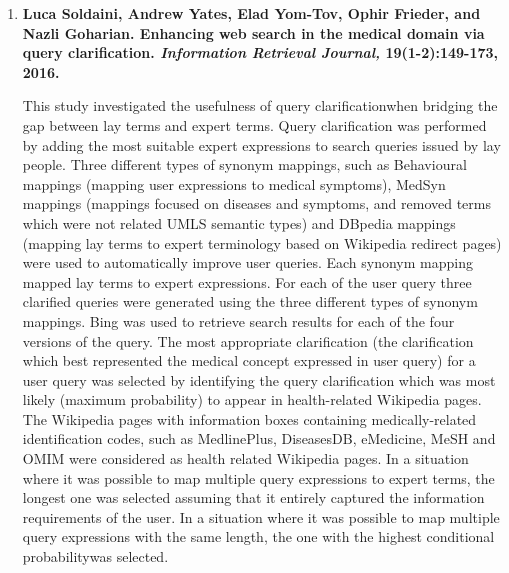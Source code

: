 \documentclass[]{article}
\begin{document}
\begin{enumerate}
\item {\textbf{Luca Soldaini, Andrew Yates, Elad Yom-Tov, Ophir Frieder, and Nazli Goharian. Enhancing web search in the medical domain via query clarification. \textit{Information Retrieval Journal, } 19(1-2):149-173, 2016.}}

This study investigated the usefulness of \textquotesingle query clarification\textquotesingle  when bridging the gap between lay terms and expert terms. Query clarification was performed by adding the most suitable expert expressions to search queries issued by lay people. Three different types of synonym mappings, such as Behavioural mappings (mapping user expressions to medical symptoms), MedSyn mappings (mappings focused on diseases and symptoms, and removed terms which were not related UMLS semantic types) and DBpedia  mappings (mapping lay terms to expert terminology based on Wikipedia redirect pages) were used to automatically improve user queries. Each synonym mapping mapped lay terms to expert expressions. For each of the user query three clarified queries were generated using the three different types of synonym mappings. Bing was used to retrieve search results for each of the four versions of the query. The most appropriate clarification (the clarification which best represented the medical concept expressed in user query) for a user query was selected by identifying the query clarification which was most likely (maximum probability) to appear in health-related Wikipedia pages. The Wikipedia pages with information boxes containing medically-related identification codes, such as MedlinePlus, DiseasesDB, eMedicine, MeSH and OMIM were considered as health related Wikipedia pages. In a situation where it was possible to map multiple query expressions to expert terms, the longest one was selected assuming that it entirely captured the information requirements of the user. In a situation where it was possible to map multiple query expressions with the same length, the one with the \textquotesingle highest conditional probability\textquotesingle was selected.  


\end{enumerate}
\end{document}

